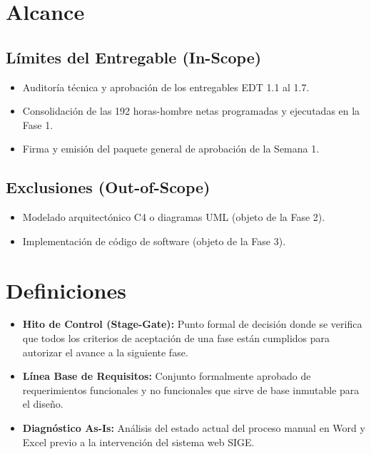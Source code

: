 \documentclass[12pt,a4paper]{article}
\begin{document}
\section{Alcance}
\subsection{Límites del Entregable (In-Scope)}
\begin{itemize}[leftmargin=1.5em, itemsep=2pt]
    \item Auditoría técnica y aprobación de los entregables EDT 1.1 al 1.7.
    \item Consolidación de las 192 horas-hombre netas programadas y ejecutadas en la Fase 1.
    \item Firma y emisión del paquete general de aprobación de la Semana 1.
\end{itemize}
\subsection{Exclusiones (Out-of-Scope)}
\begin{itemize}[leftmargin=1.5em, itemsep=2pt]
    \item Modelado arquitectónico C4 o diagramas UML (objeto de la Fase 2).
    \item Implementación de código de software (objeto de la Fase 3).
\end{itemize}

\section{Definiciones}
\begin{itemize}[leftmargin=1.5em, itemsep=2pt]
    \item \textbf{Hito de Control (Stage-Gate):} Punto formal de decisión donde se verifica que todos los criterios de aceptación de una fase están cumplidos para autorizar el avance a la siguiente fase.
    \item \textbf{Línea Base de Requisitos:} Conjunto formalmente aprobado de requerimientos funcionales y no funcionales que sirve de base inmutable para el diseño.
    \item \textbf{Diagnóstico As-Is:} Análisis del estado actual del proceso manual en Word y Excel previo a la intervención del sistema web SIGE.
\end{itemize}
\end{document}
